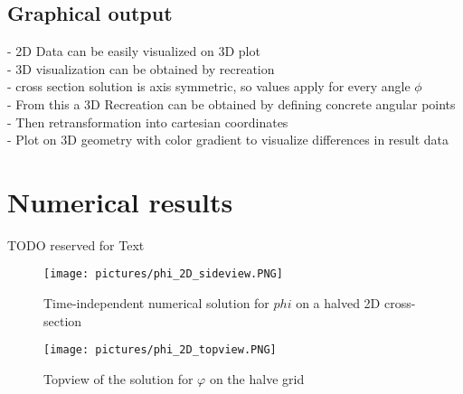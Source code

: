 \documentclass[parskip=half, titlepage=yes, 12pt, BCOR=12mm, DIV=calc]{scrartcl}
\begin{document}
\subsection{Graphical output}
- 2D Data can be easily visualized on 3D plot \\
- 3D visualization can be obtained by recreation \\
- cross section solution is axis symmetric, so values apply for every angle $\phi$ \\
- From this a 3D Recreation can be obtained by defining concrete angular points \\
- Then retransformation into cartesian coordinates \\
- Plot on 3D geometry with color gradient to visualize differences in result data \\




\section{Numerical results}


TODO reserved for Text \\

\begin{figure}[H]
    \centering
        \texttt{[image: pictures/phi\_2D\_sideview.PNG]}
        \caption{Time-independent numerical solution for $phi$ on a halved 2D cross-section}
        \label{phi_2D_sideview}
\end{figure}


\begin{figure}[H]
    \centering
        \texttt{[image: pictures/phi\_2D\_topview.PNG]}
        \caption{Topview of the solution for $\varphi$ on the halve grid}
        \label{phi_2D_topview}
\end{figure}
\end{document}

